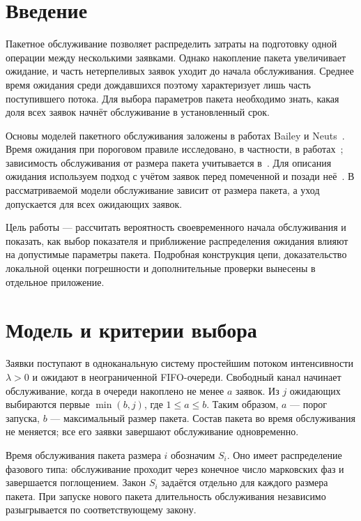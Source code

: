 \section*{Введение}

Пакетное обслуживание позволяет распределить затраты на подготовку одной операции между несколькими заявками. Однако накопление пакета увеличивает ожидание, и часть нетерпеливых заявок уходит до начала обслуживания. Среднее время ожидания среди дождавшихся поэтому характеризует лишь часть поступившего потока. Для выбора параметров пакета необходимо знать, какая доля всех заявок начнёт обслуживание в установленный срок.

Основы моделей пакетного обслуживания заложены в работах Bailey и Neuts~\cite{bailey1954,neuts1967}. Время ожидания при пороговом правиле исследовано, в частности, в работах~\cite{medhi1975,claeys2013,chaudhry2023}; зависимость обслуживания от размера пакета учитывается в~\cite{banerjee2015}. Для описания ожидания используем подход с учётом заявок перед помеченной и позади неё~\cite{vanommer2020}. В рассматриваемой модели обслуживание зависит от размера пакета, а уход допускается для всех ожидающих заявок.

Цель работы --- рассчитать вероятность своевременного начала обслуживания и показать, как выбор показателя и приближение распределения ожидания влияют на допустимые параметры пакета. Подробная конструкция цепи, доказательство локальной оценки погрешности и дополнительные проверки вынесены в отдельное приложение.

\section*{Модель и критерии выбора}

Заявки поступают в одноканальную систему простейшим потоком интенсивности $\lambda>0$ и ожидают в неограниченной FIFO-очереди. Свободный канал начинает обслуживание, когда в очереди накоплено не менее $a$ заявок. Из $j$ ожидающих выбираются первые $\min(b,j)$, где $1\leq a\leq b$. Таким образом, $a$ --- порог запуска, $b$ --- максимальный размер пакета. Состав пакета во время обслуживания не меняется; все его заявки завершают обслуживание одновременно.

Время обслуживания пакета размера $i$ обозначим $S_i$. Оно имеет распределение фазового типа: обслуживание проходит через конечное число марковских фаз и завершается поглощением. Закон $S_i$ задаётся отдельно для каждого размера пакета. При запуске нового пакета длительность обслуживания независимо разыгрывается по соответствующему закону.

